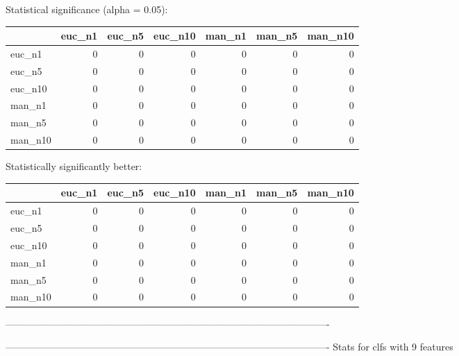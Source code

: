 Statistical significance (alpha = 0.05):
 \begin{tabular}{lrrrrrr}
\hline
         &   euc\_n1 &   euc\_n5 &   euc\_n10 &   man\_n1 &   man\_n5 &   man\_n10 \\
\hline
 euc\_n1  &        0 &        0 &         0 &        0 &        0 &         0 \\
 euc\_n5  &        0 &        0 &         0 &        0 &        0 &         0 \\
 euc\_n10 &        0 &        0 &         0 &        0 &        0 &         0 \\
 man\_n1  &        0 &        0 &         0 &        0 &        0 &         0 \\
 man\_n5  &        0 &        0 &         0 &        0 &        0 &         0 \\
 man\_n10 &        0 &        0 &         0 &        0 &        0 &         0 \\
\hline
\end{tabular} 

Statistically significantly better:
 \begin{tabular}{lrrrrrr}
\hline
         &   euc\_n1 &   euc\_n5 &   euc\_n10 &   man\_n1 &   man\_n5 &   man\_n10 \\
\hline
 euc\_n1  &        0 &        0 &         0 &        0 &        0 &         0 \\
 euc\_n5  &        0 &        0 &         0 &        0 &        0 &         0 \\
 euc\_n10 &        0 &        0 &         0 &        0 &        0 &         0 \\
 man\_n1  &        0 &        0 &         0 &        0 &        0 &         0 \\
 man\_n5  &        0 &        0 &         0 &        0 &        0 &         0 \\
 man\_n10 &        0 &        0 &         0 &        0 &        0 &         0 \\
\hline
\end{tabular} 

----------------------------------------------------------------------------------------------------



----------------------------------------------------------------------------------------------------
Stats for clfs with 9 features


